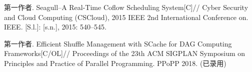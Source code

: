 
\begin{publications}{99}
    \item\textsc{第一作者}. {Seagull–A Real-Time Coflow Scheduling System}[C]// Cyber Security
    and Cloud Computing (CSCloud), 2015 IEEE 2nd International Conference on. IEEE. [S.l.]: [s.n.],
    2015: 540–545.
    \item\textsc{第一作者}. {Efficient Shuffle Management with SCache for DAG Computing Frameworks}[C/OL]// Proceedings of the 23th ACM SIGPLAN Symposium on Principles and Practice of
    Parallel Programming. PPoPP 2018. (已录用)
\end{publications}
